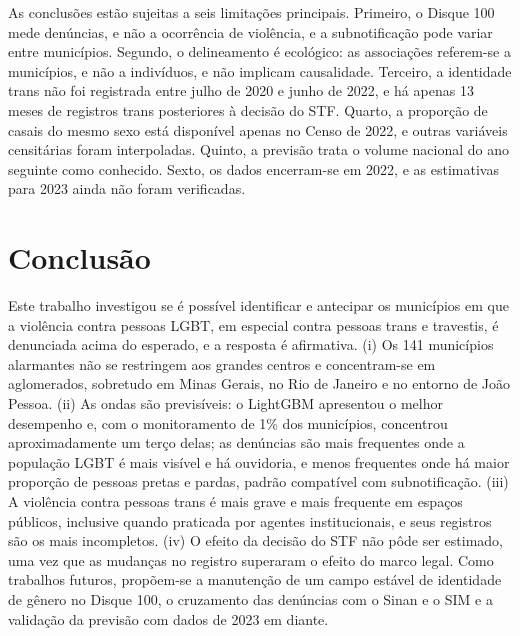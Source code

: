 \documentclass[12pt]{article}
\begin{document}
As conclusões estão sujeitas a seis limitações principais. Primeiro, o Disque 100 mede denúncias, e não a ocorrência de violência, e a subnotificação pode variar entre municípios. Segundo, o delineamento é ecológico: as associações referem-se a municípios, e não a indivíduos, e não implicam causalidade. Terceiro, a identidade trans não foi registrada entre julho de 2020 e junho de 2022, e há apenas 13 meses de registros trans posteriores à decisão do STF. Quarto, a proporção de casais do mesmo sexo está disponível apenas no Censo de 2022, e outras variáveis censitárias foram interpoladas. Quinto, a previsão trata o volume nacional do ano seguinte como conhecido. Sexto, os dados encerram-se em 2022, e as estimativas para 2023 ainda não foram verificadas.


\clearpage
\section{Conclusão}
\label{sec:conclusao}

Este trabalho investigou se é possível identificar e antecipar os municípios em que a violência contra pessoas LGBT, em especial contra pessoas trans e travestis, é denunciada acima do esperado, e a resposta é afirmativa. (i) Os 141 municípios alarmantes não se restringem aos grandes centros e concentram-se em aglomerados, sobretudo em Minas Gerais, no Rio de Janeiro e no entorno de João Pessoa. (ii) As ondas são previsíveis: o LightGBM apresentou o melhor desempenho e, com o monitoramento de 1\% dos municípios, concentrou aproximadamente um terço delas; as denúncias são mais frequentes onde a população LGBT é mais visível e há ouvidoria, e menos frequentes onde há maior proporção de pessoas pretas e pardas, padrão compatível com subnotificação. (iii) A violência contra pessoas trans é mais grave e mais frequente em espaços públicos, inclusive quando praticada por agentes institucionais, e seus registros são os mais incompletos. (iv) O efeito da decisão do STF não pôde ser estimado, uma vez que as mudanças no registro superaram o efeito do marco legal. Como trabalhos futuros, propõem-se a manutenção de um campo estável de identidade de gênero no Disque 100, o cruzamento das denúncias com o Sinan e o SIM e a validação da previsão com dados de 2023 em diante.


\clearpage


\end{document}
